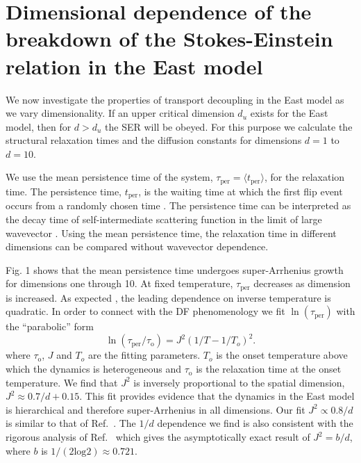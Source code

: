 \documentclass[showpacs,pre,aps,twocolumn,superscriptaddress]{revtex4-1}
\begin{document}
\section{Dimensional dependence of the breakdown of the Stokes-Einstein relation in the East model}

We now investigate the properties of transport decoupling in the East model as we vary dimensionality.  If an upper critical dimension $d_u$ exists for the East model, then for $d>d_u$ the SER will be obeyed.  For this purpose we calculate the structural relaxation times and the diffusion constants for dimensions $d=1$ to $d=10$.

We use the mean persistence time of the system, ${\tau}_{\text{per}}=\langle{t_{\text{per}}}\rangle$, for the relaxation time.
The persistence time, $t_{\text{per}}$, is the waiting time at which the first flip event occurs from a randomly chosen time \cite{Jung2004}. 
The persistence time can be interpreted as the decay time of self-intermediate scattering function in the limit of large wavevector \cite{Berthier2005}. Using the mean persistence time, the relaxation time in different dimensions can be compared without wavevector dependence.

Fig. 1 shows that the mean persistence time undergoes super-Arrhenius growth for dimensions one through 10.
At fixed temperature, ${\tau}_{\text{per}}$ decreases as dimension is increased.
As expected \cite{Sollich1999,Garrahan2003,Ashton2005,Berthier2005,Chleboun2014}, the leading dependence on inverse temperature is quadratic.  In order to connect with the DF phenomenology we fit $\ln({\tau}_{\text{per}})$ with
the ``parabolic'' form \cite{Elmatad2009,Keys2011}
\begin{equation}
    \ln({\tau}_{\text{per}}/{{\tau}_{\text{o}}})={J^2}(1/T-1/T_o)^2.
    \label{eq-tau}
\end{equation}
where ${\tau}_{\text{o}}$, $J$ and $T_o$ are the fitting parameters. 
$T_o$ is the onset temperature above which the dynamics is heterogeneous
and ${\tau}_{\text{o}}$ is the relaxation time at the onset temperature.  We find that $J^2$ is inversely proportional to the spatial dimension,
$J^2 \approx 0.7/d + 0.15$.
This fit provides evidence that the dynamics in the East model is hierarchical and therefore super-Arrhenius in all dimensions.
Our fit $J^2 \propto 0.8/d$ is similar to that of Ref.~\cite{Ashton2005}.  The $1/d$ dependence we find is also consistent with the rigorous analysis of Ref.~\cite{Chleboun2014} which gives the asymptotically exact result of $J^2 = b/d$, where $b$ is $1/(2\text{log}2)\approx0.721$. 
\end{document}
